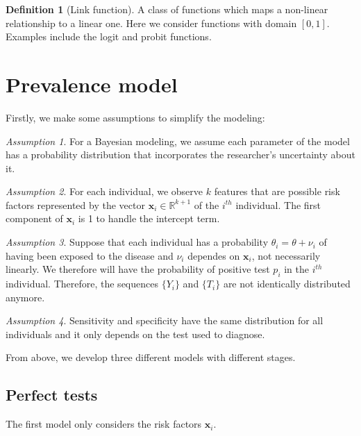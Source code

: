 \documentclass[a4paper, notitlepage, 11pt]{article}
\newcommand{\R}{\mathbb{R}}
\newcommand{\x}{\boldsymbol{x}}
\theoremstyle{definition}
\newtheorem{definition}{Definition}[section]
\theoremstyle{remark}
\newtheorem{assumption}{Assumption}
\begin{document}
\begin{definition}[Link function]
  A class of functions which maps a non-linear relationship to a linear one.
  Here we consider functions with domain $[0,1]$. Examples include the logit and probit
functions.
\end{definition}

\section{Prevalence model}

Firstly, we make some assumptions to simplify the modeling:

\begin{assumption}
  For a Bayesian modeling, we assume each parameter of the model
  has a probability distribution that incorporates the researcher's uncertainty about it. 
\end{assumption}

\begin{assumption}
  For each individual, we observe $k$ features that are possible
  risk factors represented by the vector $\x_i \in \R^{k+1}$ of the $i^{th}$ individual. The
  first component of $\x_i$ is 1 to handle the intercept term. 
\end{assumption}

\begin{assumption}
  Suppose that each individual has a probability $\theta_i = \theta + \nu_i$ of having been exposed
  to the disease and $\nu_i$ dependes on $\x_i$, not necessarily linearly.
  We therefore will have the probability of positive test $p_i$ in the
  $i^{th}$ individual. Therefore, the sequences $\{Y_i\}$ and $\{T_i\}$ are not
  identically distributed anymore.
\end{assumption} 

\begin{assumption}
  Sensitivity and specificity have the same distribution for all
  individuals and it only depends on the test used to diagnose. 
\end{assumption}

From above, we develop three different models with different stages.

\subsection{Perfect tests}

The first model only considers the risk factors $\x_i$. 
\end{document}
